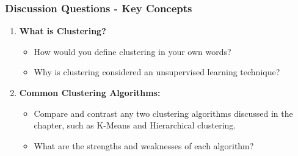 \documentclass[aspectratio=169]{beamer}
\begin{document}
\begin{frame}[fragile]
  \frametitle{Discussion Questions - Key Concepts}
  \begin{enumerate}
    \item \textbf{What is Clustering?}
        \begin{itemize}
            \item How would you define clustering in your own words?
            \item Why is clustering considered an unsupervised learning technique?
        \end{itemize}

    \item \textbf{Common Clustering Algorithms:}
        \begin{itemize}
            \item Compare and contrast any two clustering algorithms discussed in the chapter, such as K-Means and Hierarchical clustering.
            \item What are the strengths and weaknesses of each algorithm?
        \end{itemize}
  \end{enumerate}
\end{frame}
\end{document}
